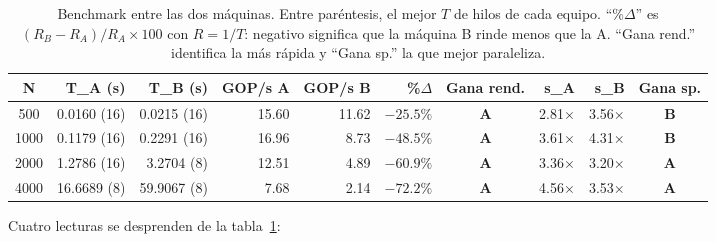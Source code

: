 \begin{table}[H]
\centering
\scriptsize
\setlength{\tabcolsep}{3.5pt}
\begin{tabular}{|c|r|r|r|r|r|c|r|r|c|}
\hline
\textbf{N} & \textbf{T\_A (s)} & \textbf{T\_B (s)} & \textbf{GOP/s A} & \textbf{GOP/s B} & \textbf{\%$\Delta$} & \textbf{Gana rend.} & \textbf{s\_A} & \textbf{s\_B} & \textbf{Gana sp.} \\
\hline
500  & 0.0160 (16) & 0.0215 (16) & 15.60 & 11.62 & $-25.5\%$ & \textbf{A} & 2.81$\times$ & 3.56$\times$ & \textbf{B} \\
1000 & 0.1179 (16) & 0.2291 (16) & 16.96 &  8.73 & $-48.5\%$ & \textbf{A} & 3.61$\times$ & 4.31$\times$ & \textbf{B} \\
2000 & 1.2786 (16) & 3.2704 (8)  & 12.51 &  4.89 & $-60.9\%$ & \textbf{A} & 3.36$\times$ & 3.20$\times$ & \textbf{A} \\
4000 & 16.6689 (8) & 59.9067 (8) &  7.68 &  2.14 & $-72.2\%$ & \textbf{A} & 4.56$\times$ & 3.53$\times$ & \textbf{A} \\
\hline
\end{tabular}
\caption{Benchmark entre las dos máquinas. Entre paréntesis, el mejor $T$ de hilos de cada equipo. ``\%$\Delta$'' es $(R_B-R_A)/R_A \times 100$ con $R=1/T$: negativo significa que la máquina B rinde menos que la A. ``Gana rend.'' identifica la más rápida y ``Gana sp.'' la que mejor paraleliza.}
\label{tab:benchmark-maquinas}
\end{table}

Cuatro lecturas se desprenden de la tabla~\ref{tab:benchmark-maquinas}:

